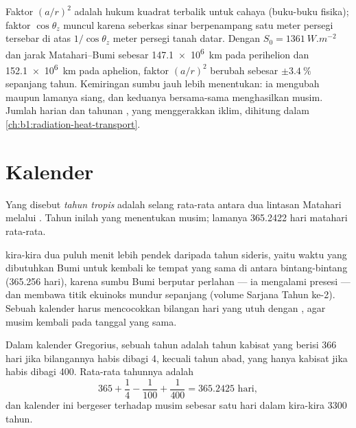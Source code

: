 Faktor $(a/r)^2$ adalah hukum kuadrat terbalik untuk cahaya (buku-buku fisika); faktor $\cos\theta_z$ muncul karena seberkas sinar berpenampang satu meter persegi tersebar di atas $1/\cos\theta_z$ meter persegi tanah datar. Dengan $S_0 = \qty{1361}{W.m^{-2}}$ dan jarak Matahari--Bumi sebesar \qty{147.1e6}{km} pada perihelion dan \qty{152.1e6}{km} pada aphelion, faktor $(a/r)^2$ berubah sebesar $\pm\qty{3.4}{\percent}$ sepanjang tahun. Kemiringan sumbu jauh lebih menentukan: ia mengubah  maupun lamanya siang, dan keduanya bersama-sama menghasilkan musim. Jumlah harian dan tahunan , yang menggerakkan iklim, dihitung dalam \cref{ch:b1:radiation-heat-transport}.


\section{Kalender}

\begin{definition}\label{def:b1:spherical-astronomy:tropical-year}
Yang disebut \emph{tahun tropis} adalah selang rata-rata antara dua lintasan Matahari melalui . Tahun inilah yang menentukan musim; lamanya 365.2422 hari matahari rata-rata.
\end{definition}

 kira-kira dua puluh menit lebih pendek daripada tahun sideris, yaitu waktu yang dibutuhkan Bumi untuk kembali ke tempat yang sama di antara bintang-bintang (365.256 hari), karena sumbu Bumi berputar perlahan --- ia mengalami presesi --- dan membawa titik ekuinoks mundur sepanjang  (volume Sarjana Tahun ke-2). Sebuah kalender harus mencocokkan bilangan hari yang utuh dengan , agar musim kembali pada tanggal yang sama.

\begin{proposition}\label{prop:b1:spherical-astronomy:gregorian}
Dalam kalender Gregorius, sebuah tahun adalah tahun kabisat yang berisi 366 hari jika bilangannya habis dibagi 4, kecuali tahun abad, yang hanya kabisat jika habis dibagi 400. Rata-rata tahunnya adalah
\[
  365 + \frac14 - \frac1{100} + \frac1{400} = \num{365.2425}\text{ hari},
\]
dan kalender ini bergeser terhadap musim sebesar satu hari dalam kira-kira 3300 tahun.
\end{proposition}

